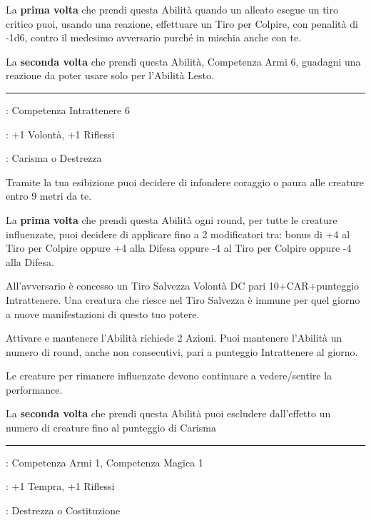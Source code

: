 \begin{multicols}{2}
La \textbf{prima volta} che prendi questa Abilità quando un alleato esegue un tiro critico puoi, usando una reazione, effettuare un Tiro per Colpire, con penalità di -1d6, contro il medesimo avversario purché in mischia anche con te.

La \textbf{seconda volta} che prendi questa Abilità, Competenza Armi 6, guadagni una reazione da poter usare solo per l'Abilità Lesto.

\smallskip\noindent\rule{\linewidth}{2pt} \hypertarget{Litania versatile}{}\medskip{}
\noindent
\begin{description}[noitemsep, topsep=0pt, parsep=0pt, partopsep=0pt, leftmargin=0cm, labelwidth=2.5cm]
    \item[\textbf{Requisito}]: Competenza Intrattenere 6
    \item[\textbf{Tiri Salvezza}]: +1 Volontà, +1 Riflessi
    \item[\textbf{Caratteristica}]: Carisma o Destrezza
\end{description}

Tramite la tua esibizione puoi decidere di infondere coraggio o paura alle creature entro 9 metri da te.

La \textbf{prima volta} che prendi questa Abilità ogni round, per tutte le creature influenzate, puoi decidere di applicare fino a 2 modificatori tra: bonus di +4 al Tiro per Colpire oppure +4 alla Difesa oppure -4 al Tiro per Colpire oppure -4 alla Difesa.

All'avversario è concesso un Tiro Salvezza Volontà DC pari 10+CAR+punteggio Intrattenere. Una creatura che riesce nel Tiro Salvezza è immune per quel giorno a nuove manifestazioni di questo tuo potere.

Attivare e mantenere l'Abilità richiede 2 Azioni. Puoi mantenere l'Abilità un numero di round, anche non consecutivi, pari a punteggio Intrattenere al giorno.

Le creature per rimanere influenzate devono continuare a vedere/sentire la performance.

La \textbf{seconda volta} che prendi questa Abilità puoi escludere dall'effetto un numero di creature fino al punteggio di Carisma

\smallskip\noindent\rule{\linewidth}{2pt} \hypertarget{Lo scudo è mio amico}{}\medskip{}
\noindent
\begin{description}[noitemsep, topsep=0pt, parsep=0pt, partopsep=0pt, leftmargin=0cm, labelwidth=2.5cm]
    \item[\textbf{Requisito}]: Competenza Armi 1, Competenza Magica 1
    \item[\textbf{Tiri Salvezza}]: +1 Tempra, +1 Riflessi
    \item[\textbf{Caratteristica}]: Destrezza o Costituzione
\end{description}


\end{multicols}
